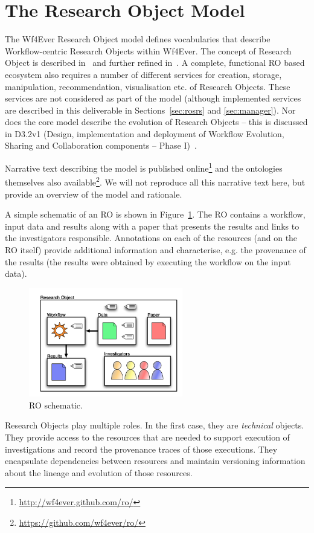 \section{The Research Object Model}
\label{sec:model}

The Wf4Ever Research Object model defines vocabularies that describe Workflow-centric Research Objects within Wf4Ever. The concept of Research Object is described in~\cite{bechhofer11:not-enough} and further refined in~\cite{belhajjame12:citizens}. A complete, functional RO based ecosystem also requires a number of different services for creation, storage, manipulation, recommendation, visualisation etc. of Research Objects. These services are not considered as part of the model (although implemented services are described in this deliverable in Sections~\ref{sec:rosrs} and \ref{sec:manager}). Nor does the core model describe the evolution of Research Objects -- this is discussed in D3.2v1 (Design, implementation and deployment of Workflow Evolution, Sharing and Collaboration components -- Phase I)~\cite{D3.2v1}.

Narrative text describing the model is published online\footnote{\url{http://wf4ever.github.com/ro/}} and the ontologies themselves also available\footnote{\url{https://github.com/wf4ever/ro/}}. We will not reproduce all this narrative text here, but provide an overview of the model and rationale.

A simple schematic of an RO is shown in Figure~\ref{fig:ro}. The RO contains a workflow, input data and results along with a paper that presents the results and links to the investigators responsible. Annotations on each of the resources (and on the RO itself) provide additional information and characterise, e.g. the provenance of the results (the results were obtained by executing the workflow on the input data). 

\begin{figure}[ht]
  \centering
  \includegraphics[width=0.6\textwidth]{Figures/RO-cartoon}
  \caption{RO schematic.}
  \label{fig:ro}
\end{figure}
 Research Objects play multiple roles. In the first case, they are \emph{technical} objects. They provide access to the resources that are needed to support execution of investigations and record the provenance traces of those executions. They encapsulate dependencies between resources and maintain versioning information about the lineage and evolution of those resources.

